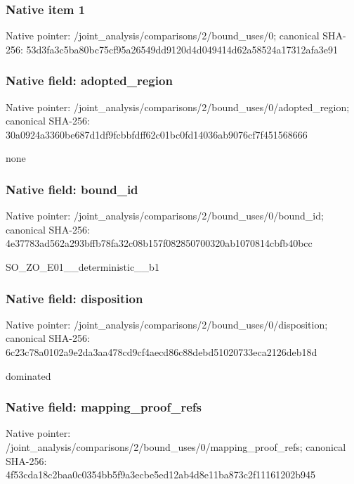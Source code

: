 \documentclass[10pt,a4paper]{article}
\begin{document}
\subsubsection{Native item 1}
Native pointer: /joint\_\allowbreak{}analysis/comparisons/2/bound\_\allowbreak{}uses/0; canonical SHA-256: 53d3fa3c5ba80bc75cf95a26549dd9120d4d049414d62a58524a17312afa3e91

\subsubsection{Native field: adopted\_\allowbreak{}region}
Native pointer: /joint\_\allowbreak{}analysis/comparisons/2/bound\_\allowbreak{}uses/0/adopted\_\allowbreak{}region; canonical SHA-256: 30a0924a3360be687d1df9fcbbfdff62c01bc0fd14036ab9076cf7f451568666

\begingroup\raggedright\sloppy none\par\endgroup

\subsubsection{Native field: bound\_\allowbreak{}id}
Native pointer: /joint\_\allowbreak{}analysis/comparisons/2/bound\_\allowbreak{}uses/0/bound\_\allowbreak{}id; canonical SHA-256: 4e37783ad562a293bffb78fa32c08b157f082850700320ab1070814cbfb40bcc

\begingroup\raggedright\sloppy SO\_\allowbreak{}ZO\_\allowbreak{}E01\_\allowbreak{}\_\allowbreak{}deterministic\_\allowbreak{}\_\allowbreak{}b1\par\endgroup

\subsubsection{Native field: disposition}
Native pointer: /joint\_\allowbreak{}analysis/comparisons/2/bound\_\allowbreak{}uses/0/disposition; canonical SHA-256: 6c23c78a0102a9e2da3aa478cd9cf4aecd86c88debd51020733eca2126deb18d

\begingroup\raggedright\sloppy dominated\par\endgroup

\subsubsection{Native field: mapping\_\allowbreak{}proof\_\allowbreak{}refs}
Native pointer: /joint\_\allowbreak{}analysis/comparisons/2/bound\_\allowbreak{}uses/0/mapping\_\allowbreak{}proof\_\allowbreak{}refs; canonical SHA-256: 4f53cda18c2baa0c0354bb5f9a3ecbe5ed12ab4d8e11ba873c2f11161202b945
\end{document}
